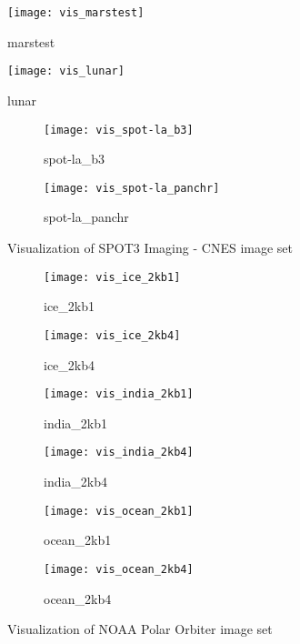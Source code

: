 \begin{figure}[h]
    \texttt{[image: vis\_marstest]}
    \caption{marstest}
    \label{fig:marstest}
\end{figure}

\begin{figure}[h]
    \texttt{[image: vis\_lunar]}
    \caption{lunar}
    \label{fig:lunar}
\end{figure}

\begin{figure}[tb]
  \begin{subfigure}[b]{0.48\textwidth}
    \texttt{[image: vis\_spot-la\_b3]}
    \caption{spot-la\_b3}
    \label{fig:spot-la_b3}
  \end{subfigure}
  \quad
  \begin{subfigure}[b]{0.48\textwidth}
    \texttt{[image: vis\_spot-la\_panchr]}
    \caption{spot-la\_panchr}
    \label{fig:spot-la_panchr}
  \end{subfigure}
\caption{Visualization of SPOT3 Imaging - \gls{CNES} image set}
\label{img:refimgcoastal}
\end{figure}

\begin{figure}[tb]
\begin{subfigure}[b]{0.38\textwidth}
    \texttt{[image: vis\_ice\_2kb1]}
    \caption{ice\_2kb1}
    \label{fig:ice_2kb1}
  \end{subfigure}
  \quad
  \quad
  \begin{subfigure}[b]{0.38\textwidth}
    \texttt{[image: vis\_ice\_2kb4]}
    \caption{ice\_2kb4}
    \label{fig:ice_2kb4}
  \end{subfigure}
  \begin{subfigure}[b]{0.38\textwidth}
    \texttt{[image: vis\_india\_2kb1]}
    \caption{india\_2kb1}
    \label{fig:india_2kb1}
  \end{subfigure}
  \quad
  \quad
  \begin{subfigure}[b]{0.38\textwidth}
    \texttt{[image: vis\_india\_2kb4]}
    \caption{india\_2kb4}
    \label{fig:india_2kb4}
  \end{subfigure}
  \begin{subfigure}[b]{0.38\textwidth}
    \texttt{[image: vis\_ocean\_2kb1]}
    \caption{ocean\_2kb1}
    \label{fig:ocean_2kb1}
  \end{subfigure}
  \quad
  \quad
  \begin{subfigure}[b]{0.38\textwidth}
    \texttt{[image: vis\_ocean\_2kb4]}
    \caption{ocean\_2kb4}
    \label{fig:ocean_2kb4}
  \end{subfigure}
\caption{Visualization of NOAA Polar Orbiter image set}
\label{img:refimgpolar}
\end{figure}

